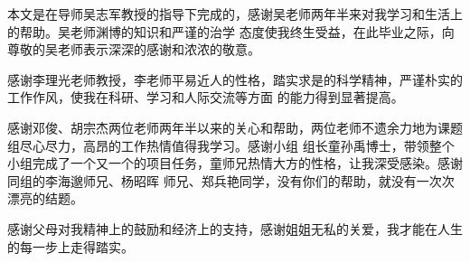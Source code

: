 

\begin{ack}
本文是在导师吴志军教授的指导下完成的，感谢吴老师两年半来对我学习和生活上的帮助。吴老师渊博的知识和严谨的治学
态度使我终生受益，在此毕业之际，向尊敬的吴老师表示深深的感谢和浓浓的敬意。\par
感谢李理光老师教授，李老师平易近人的性格，踏实求是的科学精神，严谨朴实的工作作风，使我在科研、学习和人际交流等方面
的能力得到显著提高。\par
感谢邓俊、胡宗杰两位老师两年半以来的关心和帮助，两位老师不遗余力地为课题组尽心尽力，高昂的工作热情值得我学习。感谢小组
组长童孙禹博士，带领整个小组完成了一个又一个的项目任务，童师兄热情大方的性格，让我深受感染。感谢同组的李海邈师兄、杨昭晖
师兄、郑兵艳同学，没有你们的帮助，就没有一次次漂亮的结题。\par
感谢父母对我精神上的鼓励和经济上的支持，感谢姐姐无私的关爱，我才能在人生的每一步上走得踏实。
\end{ack}
